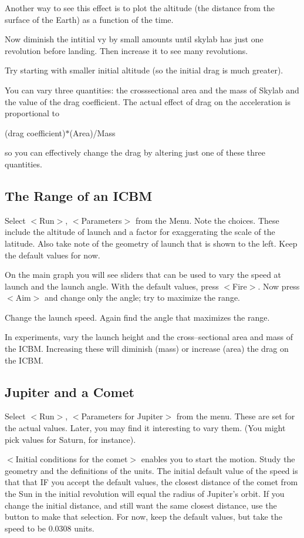    Another way to see this effect is to plot the altitude (the distance
from the surface of the Earth) as a function of the time.

   Now diminish the intitial vy by small amounts until skylab has just
one revolution before landing. Then increase it to see many revolutions.

   Try starting with smaller initial altitude (so the initial drag is
much greater).

   You can vary three quantities: the crosssectional area and the mass
of Skylab and the value of the drag coefficient. The actual effect of
drag on the acceleration is proportional to

           (drag coefficient)$*$(Area)/Mass

\noindent so you can effectively change the drag by altering just one of these
three quantities.


\subsection{The Range of an ICBM}

   Select $<$Run$>$, $<$Parameters$>$ from the Menu. Note the choices. These
include the altitude of launch and a factor for exaggerating the
scale of the latitude. Also take note of the geometry of launch that
is shown to the left. Keep the default values for now.

   On the main graph you will see sliders that can be used to vary
the speed at launch and the launch angle. With the default values,
press $<$Fire$>$. Now press $<$Aim$>$ and change only the angle; try to
maximize the range.

   Change the launch speed. Again find the angle that maximizes the range.

   In experiments, vary the launch height and the cross--sectional area
and mass of the ICBM. Increasing these will diminish (mass) or increase
(area) the drag on the ICBM.


\subsection{Jupiter and a Comet}

   Select $<$Run$>$, $<$Parameters for Jupiter$>$ from the menu. These are
set for the actual values. Later, you may find it interesting to vary
them. (You might pick values for Saturn, for instance).

   $<$Initial conditions for the comet$>$ enables you to start the motion.
Study the geometry and the definitions of the units. The initial default
value of the speed is that that IF you accept the default values, the
closest distance of the comet from the Sun in the initial revolution
will equal the radius of Jupiter's orbit. If you change the initial
distance, and still want the same closest distance, use the button to
make that selection. For now, keep the default values, but take the
speed to be 0.0308 units.

